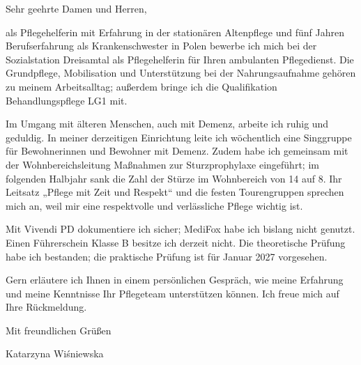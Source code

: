 \documentclass[11pt,a4paper]{article}
\begin{document}
Sehr geehrte Damen und Herren,

als Pflegehelferin mit Erfahrung in der stationären Altenpflege und fünf Jahren Berufserfahrung als Krankenschwester in Polen bewerbe ich mich bei der Sozialstation Dreisamtal als Pflegehelferin für Ihren ambulanten Pflegedienst. Die Grundpflege, Mobilisation und Unterstützung bei der Nahrungsaufnahme gehören zu meinem Arbeitsalltag; außerdem bringe ich die Qualifikation Behandlungspflege LG1 mit.

Im Umgang mit älteren Menschen, auch mit Demenz, arbeite ich ruhig und geduldig. In meiner derzeitigen Einrichtung leite ich wöchentlich eine Singgruppe für Bewohnerinnen und Bewohner mit Demenz. Zudem habe ich gemeinsam mit der Wohnbereichsleitung Maßnahmen zur Sturzprophylaxe eingeführt; im folgenden Halbjahr sank die Zahl der Stürze im Wohnbereich von 14 auf 8. Ihr Leitsatz „Pflege mit Zeit und Respekt“ und die festen Tourengruppen sprechen mich an, weil mir eine respektvolle und verlässliche Pflege wichtig ist.

Mit Vivendi PD dokumentiere ich sicher; MediFox habe ich bislang nicht genutzt. Einen Führerschein Klasse B besitze ich derzeit nicht. Die theoretische Prüfung habe ich bestanden; die praktische Prüfung ist für Januar 2027 vorgesehen.

Gern erläutere ich Ihnen in einem persönlichen Gespräch, wie meine Erfahrung und meine Kenntnisse Ihr Pflegeteam unterstützen können. Ich freue mich auf Ihre Rückmeldung.

Mit freundlichen Grüßen

Katarzyna Wiśniewska
\end{document}
